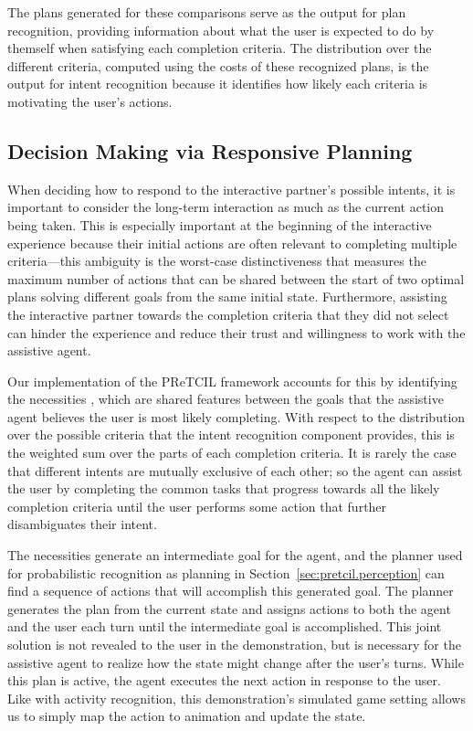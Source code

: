 \documentclass[letterpaper]{article} %
\begin{document}
The plans generated for these comparisons serve as the output for plan recognition, providing information about what the user is expected to do by themself when satisfying each completion criteria.  The distribution over the different criteria, computed using the costs of these recognized plans, is the output for intent recognition because it identifies how likely each criteria is motivating the user's actions.

\subsection{Decision Making via Responsive Planning\label{sec:pretcil.dec_making}}
When deciding how to respond to the interactive partner's possible intents, it is important to consider the long-term interaction as much as the current action being taken.  This is especially important at the beginning of the interactive experience because their initial actions are often relevant to completing multiple criteria---this ambiguity is the worst-case distinctiveness \cite{keren_ICAPS147814} that measures the maximum number of actions that can be shared between the start of two optimal plans solving different goals from the same initial state.  
Furthermore, assisting the interactive partner towards the completion criteria that they did not select can hinder the experience and reduce their trust and willingness to work with the assistive agent.

Our implementation of the {\sc PReTCIL} framework accounts for this by identifying the necessities \cite{fz_aaai2017}, which are shared features between the goals that the assistive agent believes the user is most likely completing.  With respect to the distribution over the possible criteria that the intent recognition component provides, this is the weighted sum over the parts of each completion criteria.  It is rarely the case that different intents are mutually exclusive of each other; so the agent can assist the user by completing the common tasks that progress towards all the likely completion criteria until the user performs some action that further disambiguates their intent.

The necessities generate an intermediate goal for the agent, and the planner used for probabilistic recognition as planning in Section~\ref{sec:pretcil.perception} can find a sequence of actions that will accomplish this generated goal.  The planner generates the plan from the current state and assigns actions to both the agent and the user each turn until the intermediate goal is accomplished.  This joint solution is not revealed to the user in the demonstration, but is necessary for the assistive agent to realize how the state might change after the user's turns.  While this plan is active, the agent executes the next action in response to the user.  Like with activity recognition, this demonstration's simulated game setting allows us to simply map the action to animation and update the state.
\end{document}
